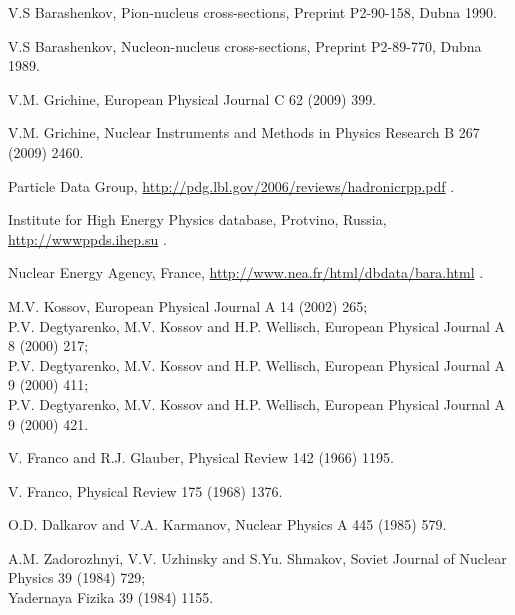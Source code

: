 %
%
 V.S Barashenkov, Pion-nucleus cross-sections,
                       Preprint P2-90-158, Dubna 1990.

 V.S Barashenkov, Nucleon-nucleus cross-sections,
                       Preprint P2-89-770, Dubna 1989.

 V.M. Grichine, European Physical Journal C 62 (2009) 399.

 V.M. Grichine,
                        Nuclear Instruments and Methods in Physics Research B 267 (2009) 2460.

 Particle Data Group, \url{http://pdg.lbl.gov/2006/reviews/hadronicrpp.pdf} .

 Institute for High Energy Physics database, Protvino, Russia,
                          \url{http://wwwppds.ihep.su} .

 Nuclear Energy Agency, France,
                           \url{http://www.nea.fr/html/dbdata/bara.html} .

 M.V. Kossov, European Physical Journal A 14 (2002) 265; \\
                       P.V. Degtyarenko, M.V. Kossov and H.P. Wellisch,
                         European Physical Journal A 8 (2000) 217; \\
                       P.V. Degtyarenko, M.V. Kossov and H.P. Wellisch,
                         European Physical Journal A 9 (2000) 411; \\
                       P.V. Degtyarenko, M.V. Kossov and H.P. Wellisch,
                         European Physical Journal A 9 (2000) 421.

 V. Franco and R.J. Glauber,
                        Physical Review 142 (1966) 1195.

 V. Franco, Physical Review 175 (1968) 1376.

 O.D. Dalkarov and V.A. Karmanov,
                        Nuclear Physics A 445 (1985) 579.

 A.M. Zadorozhnyi, V.V. Uzhinsky and S.Yu. Shmakov,
                        Soviet Journal of Nuclear Physics 39 (1984) 729; \\
                        Yadernaya Fizika 39 (1984) 1155.

